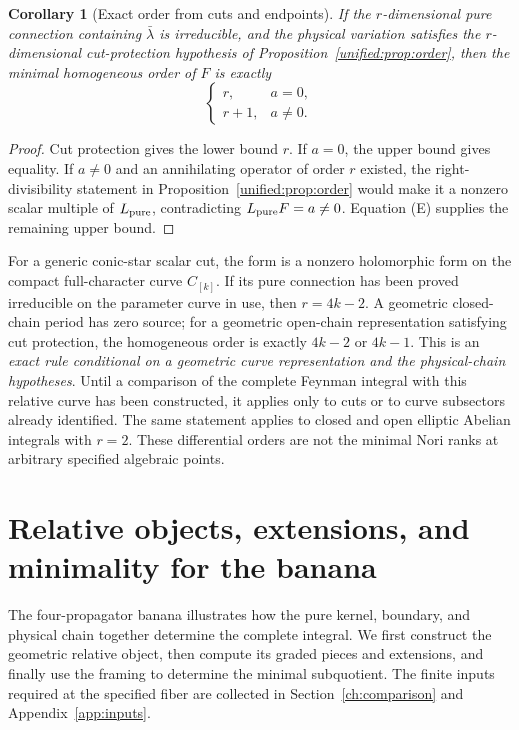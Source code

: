 \documentclass[11pt,a4paper,oneside]{article}
\theoremstyle{plain}
\newtheorem{corollary}[theorem]{Corollary}
\theoremstyle{definition}
\theoremstyle{remark}
\numberwithin{equation}{section}
\begin{document}
\begin{corollary}[Exact order from cuts and endpoints]\label{unified:cor:exact-order}
If the $r$-dimensional pure connection containing $\bar\lambda$ is irreducible,
and the physical variation satisfies the $r$-dimensional cut-protection hypothesis of Proposition~\ref{unified:prop:order},
then the minimal homogeneous order of $F$ is exactly
\[
 \begin{cases}
 r,&a=0,\\
 r+1,&a\ne0.
 \end{cases}
\]
\end{corollary}
\begin{proof}
Cut protection gives the lower bound $r$. If $a=0$, the upper bound gives equality.
If $a\ne0$ and an annihilating operator of order $r$ existed, the right-divisibility statement in Proposition~\ref{unified:prop:order}
would make it a nonzero scalar multiple of $L_{\rm pure}$,
contradicting $L_{\rm pure}F=a\ne0$. Equation (E) supplies the remaining upper bound.
\end{proof}
For a generic conic-star scalar cut, the form is a nonzero holomorphic form on the compact full-character curve $C_{[k]}$.
If its pure connection has been proved irreducible on the parameter curve in use, then $r=4k-2$.
A geometric closed-chain period has zero source; for a geometric open-chain representation satisfying cut protection,
the homogeneous order is exactly $4k-2$ or $4k-1$.
This is an \emph{exact rule conditional on a geometric curve representation and the physical-chain hypotheses}.
Until a comparison of the complete Feynman integral with this relative curve has been constructed,
it applies only to cuts or to curve subsectors already identified.
The same statement applies to closed and open elliptic Abelian integrals with $r=2$.
These differential orders are not the minimal Nori ranks at arbitrary specified algebraic points.


\endgroup


\section{Relative objects, extensions, and minimality for the banana}\label{ch:core}

\begingroup

The four-propagator banana illustrates how the pure kernel, boundary, and physical chain together determine the complete integral. We first construct the geometric relative object, then compute its graded pieces and extensions, and finally use the framing to determine the minimal subquotient. The finite inputs required at the specified fiber are collected in Section~\ref{ch:comparison} and Appendix~\ref{app:inputs}.
\end{document}
